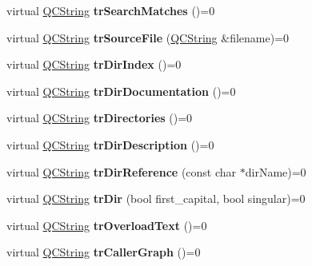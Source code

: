 \begin{DoxyCompactItemize}
virtual \mbox{\hyperlink{class_q_c_string}{Q\+C\+String}} {\bfseries tr\+Search\+Matches} ()=0
\item 
\mbox{\label{class_translator_a25a12bd37f32c6ff636cd7d227175a5a}} 
virtual \mbox{\hyperlink{class_q_c_string}{Q\+C\+String}} {\bfseries tr\+Source\+File} (\mbox{\hyperlink{class_q_c_string}{Q\+C\+String}} \&filename)=0
\item 
\mbox{\label{class_translator_a11169ba583e072969866a1c2ab5adacb}} 
virtual \mbox{\hyperlink{class_q_c_string}{Q\+C\+String}} {\bfseries tr\+Dir\+Index} ()=0
\item 
\mbox{\label{class_translator_ab3aee25a206ae53f6d4198b736a6b87d}} 
virtual \mbox{\hyperlink{class_q_c_string}{Q\+C\+String}} {\bfseries tr\+Dir\+Documentation} ()=0
\item 
\mbox{\label{class_translator_a15ab2414971ee4ece3b2b59f7a4f67bf}} 
virtual \mbox{\hyperlink{class_q_c_string}{Q\+C\+String}} {\bfseries tr\+Directories} ()=0
\item 
\mbox{\label{class_translator_a44999ecffbd6fbdcc19918b3230c6e40}} 
virtual \mbox{\hyperlink{class_q_c_string}{Q\+C\+String}} {\bfseries tr\+Dir\+Description} ()=0
\item 
\mbox{\label{class_translator_ad137eb4290b99385fc32b4e5bdd72ada}} 
virtual \mbox{\hyperlink{class_q_c_string}{Q\+C\+String}} {\bfseries tr\+Dir\+Reference} (const char $\ast$dir\+Name)=0
\item 
\mbox{\label{class_translator_a63ce770ac66730a13f1686202e0c5d46}} 
virtual \mbox{\hyperlink{class_q_c_string}{Q\+C\+String}} {\bfseries tr\+Dir} (bool first\+\_\+capital, bool singular)=0
\item 
\mbox{\label{class_translator_af933c719d65181b1cb11a7d07db37a09}} 
virtual \mbox{\hyperlink{class_q_c_string}{Q\+C\+String}} {\bfseries tr\+Overload\+Text} ()=0
\item 
\mbox{\label{class_translator_a4c8eaa74686abf7667ee9f0ac0b0bacd}} 
virtual \mbox{\hyperlink{class_q_c_string}{Q\+C\+String}} {\bfseries tr\+Caller\+Graph} ()=0

\end{DoxyCompactItemize}
